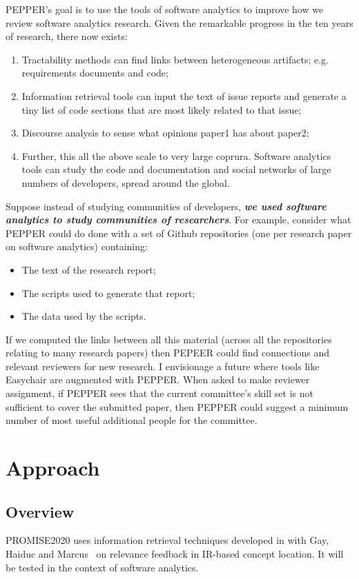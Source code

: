 \documentclass[journal]{IEEEtran}
\newcommand{\bi}{\begin{itemize}}
\newcommand{\ei}{\end{itemize}}
\newcommand{\be}{\begin{enumerate}}
\newcommand{\ee}{\end{enumerate}}
\begin{document}
PEPPER's goal is to use the tools of software analytics to improve how we review
software analytics research. 
Given  the remarkable progress  in the ten years of research, 
there now exists:
\be
\item
Tractability methods can find links between heterogeneous artifacts; e.g. requirements
documents and code;
\item
Information retrieval tools can input  the text of issue reports and generate a tiny
list of code sections that are most likely related to that issue;
\item
Discourse analysis to sense what opinions paper1 has about paper2;
\item
Further, this  all the above scale to very large coprura. Software analytics tools can  study the code and documentation and social networks
of large numbers of developers, spread around the global.
\ee
Suppose instead of studying communities of developers, {\bf {\em we
used software analytics to study communities of researchers}}.
For example, consider what PEPPER could do  done with
a set of Github repositories (one per research paper 
on software analytics) containing:
\bi
\item
The text of the research report;
\item
The scripts used to generate that report;
\item
The data used by the scripts. 
\ei
If we computed the links between all this material
(across all the repositories relating to many research papers) then
PEPEER could find connections and relevant reviewers for
new research. I envisionage a future where tools like
Easychair are augmented with PEPPER. When asked to make reviewer
assignment, 
if PEPPER  sees that the current committee's skill set is not sufficient
to cover the submitted paper, then 
PEPPER could suggest a minimum number of most useful additional people for the committee.



\section{Approach}
\subsection{Overview}
PROMISE2020  uses information retrieval techniques developed in      with Gay, Haiduc and Marcus~\cite{me09k} on relevance feedback in IR-based concept
location. It will  be tested in the context of software analytics.
\end{document}
